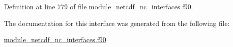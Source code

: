 Definition at line 779 of file module\+\_\+netcdf\+\_\+nc\+\_\+interfaces.\+f90.



The documentation for this interface was generated from the following file\+:\begin{DoxyCompactItemize}
\item 
\hyperlink{module__netcdf__nc__interfaces_8f90}{module\+\_\+netcdf\+\_\+nc\+\_\+interfaces.\+f90}\end{DoxyCompactItemize}
